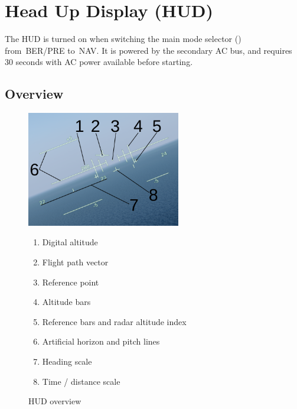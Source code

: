 \section{Head Up Display (HUD)}
The HUD is turned on when switching the main mode selector
() from~BER/PRE to~NAV.
It is powered by the secondary AC bus, and requires 30 seconds with AC power available before starting.

\subsection{Overview}
\begin{figure}[!ht]
  \centering
  \includegraphics[width=0.6\textwidth]{images/displays/ajs-hud-general.png}

  \begin{multicols}{2}
    \begin{enumerate}[nosep]
      \item \label{item:digalt} Digital altitude
      \item \label{item:fpv} Flight path vector
      \item \label{item:refpt} Reference point
      \item \label{item:alt} Altitude bars
      \item \label{item:refbars} Reference bars and radar altitude index
      \item \label{item:horizon} Artificial horizon and pitch lines
      \item \label{item:heading-hud} Heading scale
      \item \label{item:timeline} Time / distance scale
    \end{enumerate}
  \end{multicols}

  \caption{HUD overview}
  \label{fig:hud}
\end{figure}

